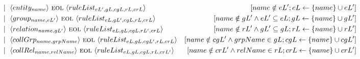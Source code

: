 \begin{landscape}
\begin{adjustbox}{max width=\linewidth,max height=.95\textheight,valign=c}
{\begin{align}
                                                            & ~~ \mid ~ \langle entity_{name}          \rangle ~\textsc{eol}~ \langle ruleList_{eL',gL,cgL,rL,crL} \rangle                                                                                                                                                                                                                                                                                 & [name \notin eL'; eL \gets \{name\} \cup eL']                                                                     \label{meta:ruleList:2} \\
                                                            & ~~ \mid ~ \langle group_{name, eL'}      \rangle ~\textsc{eol}~ \langle ruleList_{eL,gL',cgL,rL,crL} \rangle                                                                                                                                                                                                                                                                                 & [name \notin gL' \land eL' \subseteq eL; gL \gets \{name\} \cup gL']                                              \label{meta:ruleList:3} \\
                                                            & ~~ \mid ~ \langle relation_{name, gL'}   \rangle ~\textsc{eol}~ \langle ruleList_{eL,gL,cgL,rL',crL} \rangle                                                                                                                                                                                                                                                                                 & [name \notin rL' \land gL' \subseteq gL; rL \gets \{name\} \cup rL']                                              \label{meta:ruleList:4} \\
                                                            & ~~ \mid ~ \langle collGrp_{name,grpName} \rangle ~\textsc{eol}~ \langle ruleList_{eL,gL,cgL',rL,crL} \rangle                                                                                                                                                                                                                                                                                 & [name \notin cgL' \land grpName \in gL; cgL \gets \{name\} \cup cgL']                                             \label{meta:ruleList:5} \\
                                                            & ~~ \mid ~ \langle collRel_{name,relName} \rangle ~\textsc{eol}~ \langle ruleList_{eL,gL,cgL,rL,crL'} \rangle                                                                                                                                                                                                                                                                                 & [name \notin crL' \land relName \in rL; crL \gets \{name\} \cup crL']                                             \label{meta:ruleList:6} \\[1em]

\end{align}}
\end{adjustbox}
\end{landscape}
